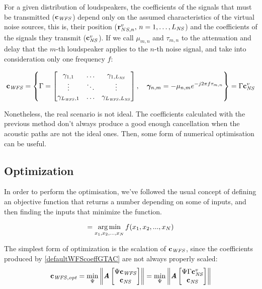 For a given distribution of loudspeakers, the coefficients of the signals that must be transmitted ($\mathbf{c}_{\mathit{WFS}}$) depend only on the assumed characteristics of the virtual noise sources, this is, their position ($\mathbf{r}_{NS, n}^v,\, n = 1, \ldots, L_\mathit{NS}$) and the coefficients of the signals they transmit ($\mathbf{c}_{\mathit{NS}}^v$). If we call $\mu_{m,n}$ and $\tau_{m,n}$ to the attenuation and delay that the $m$-th loudspeaker applies to the $n$-th noise signal, and take into consideration only one frequency $f$:

\begin{equation}
\cwfs = 
 \left\{ \wfsNormCoef[mat] = \begin{bmatrix}
\wfsNormCoef[scalar]_{1,1} & \ldots & \wfsNormCoef[scalar]_{1,\numNS} \\
\vdots & \ddots & \vdots \\
\wfsNormCoef[scalar]_{\numWFS,1} & \ldots & \wfsNormCoef[scalar]_{\numWFS,\numNS}
\end{bmatrix},\quad \wfsNormCoef_{n,m} = -\mu_{n,m} e^{-j 2 \pi f \tau_{m,n}} 
\right\}
= \wfsNormCoef[mat] \cns^v
\label{defaultWFScoeffGTAC}
\end{equation}

Nonetheless, the real scenario is not ideal. The coefficients calculated with the previous method don't always produce a good enough cancellation when the acoustic paths are not the ideal ones. Then, some form of numerical optimisation can be useful.

\subsection{Optimization} \label{optimization}
In order to perform the optimisation, we've followed the usual concept of defining an objective function that returns a number depending on some of inputs, and then finding the inputs that minimize the function.

\begin{equation}
[x_{\mathit{opt} (1)}, x_{\mathit{opt} (2)}, ..., x_{\mathit{opt} (N)}] = \argmin_{x_1, x_2, ..., x_N} f(x_1, x_2, ..., x_N)
\label{optimisationGeneral}
\end{equation}

The simplest form of optimization is the scalation of $\mathbf{c}_{\mathit{WFS}}$, since the coefficients produced by \autoref{defaultWFScoeffGTAC} are not always properly scaled:
\begin{equation}
	\vec{c}_{\mathit{WFS}, \mathit{opt}} =
	\min_{\Psi}
	\norm{\myMatrix{A}
		\begin{bmatrix}
			\Psi \vec{c_\mathit{WFS}}\\
			\vec{c_\mathit{NS}}\\
		\end{bmatrix}
	} = \min_{\Psi}
\norm{\myMatrix{A}
\begin{bmatrix}
	\Psi \wfsNormCoef[mat] \cns^v\\
	\vec{c_\mathit{NS}}\\
\end{bmatrix}
}\label{OptScalation}
\end{equation}

